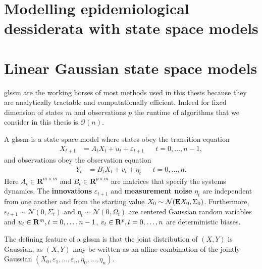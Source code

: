 \section{Modelling epidemiological dessiderata with state space models}
\label{sec:modelling_epidemiological_dessiderata_with_state_space_models}

\section{Linear Gaussian state space models}
\label{sec:linear_gaussian_state_space_models}

\gls{glssm} are the working horses of most methods used in this thesis because they are analytically tractable and computationally efficient. Indeed for fixed dimension of states $m$ and observations $p$ the runtime of algorithms that we consider in this thesis is $\mathcal O(n)$.

\begin{definition}
    \label{def:glssm}
    A \gls{glssm} is a state space model where states obey the transition equation
    \begin{align}
        \label{eq:glssm_states}
        X_{t + 1} & = A_{t}X_{t} + u_{t} + \varepsilon_{t + 1} &  & t = 0, \dots, n - 1,
    \end{align}
    and observations obey the observation equation
    \begin{align}
        \label{eq:glssm_observations}
        Y_{t} & = B_{t}X_{t} + v_{t} + \eta_{t} &  & t = 0, \dots, n.
    \end{align}
    Here $A_{t} \in \mathbf{R}^{m \times m}$ and $B_{t} \in \mathbf{R}^{p \times m}$ are matrices that specify the systems dynamics. The \textbf{innovations} $\varepsilon_{t + 1}$ and \textbf{measurement noise} $\eta_{t}$ are independent from one another and from the starting value $X_{0} \sim \mathcal N (\mathbf E X_{0}, \Sigma_{0})$. Furthermore, $\varepsilon_{t+1} \sim \mathcal N(0, \Sigma_{t})$ and $\eta_{t}\sim \mathcal N(0, \Omega_{t})$ are centered Gaussian random variables and $u_{t} \in \mathbf R^{m}, t = 0, \dots, n - 1$, $v_{t} \in \mathbf R^{p}, t = 0, \dots, n$ are deterministic biases.
\end{definition}

The defining feature of a \gls{glssm} is that the joint distribution of $(X,Y)$ is Gaussian, as $(X,Y)$ may be written as an affine combination of the jointly Gaussian $(X_{0}, \varepsilon_{1}, \dots, \varepsilon_{n}, \eta_{0}, \dots, \eta_{n})$. 

